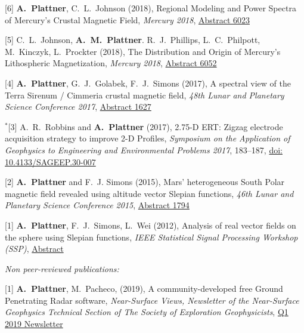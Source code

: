 \documentclass[10pt]{article}
\begin{document}
\spcp
\hspace{-0.5cm}[6] \textbf{A.~Plattner}, C.~L.~Johnson (2018),
Regional Modeling and Power Spectra of Mercury's Crustal Magnetic Field,
\emph{Mercury 2018},
\href{https://www.hou.usra.edu/meetings/mercury2018/pdf/6023.pdf}{Abstract 6023}

\spcp
\hspace{-0.5cm}[5] C.~L.~Johnson,
\textbf{A.~M.~Plattner}. R.~J.~Phillips, L.~C.~Philpott, M.~Kinczyk,
L.~Prockter (2018), The Distribution and Origin of Mercury's Lithospheric Magnetization, \emph{Mercury 2018},
\href{https://www.hou.usra.edu/meetings/mercury2018/pdf/6052.pdf}{Abstract
  6052}

\spcp
\hspace{-0.5cm}[4] \textbf{A.~Plattner}, G.~J.~Golabek, F.~J.~Simons (2017),
A spectral view of the Terra Sirenum / Cimmeria crustal magnetic
field,
\emph{48th Lunar and Planetary Science Conference 2017},
\href{http://www.lpi.usra.edu/meetings/lpsc2017/pdf/1627.pdf}{Abstract 1627}

\spcp
\hspace{-0.67cm}$^*$[3] A.~R.~Robbins and \textbf{A.~Plattner}
(2017),
2.75-D ERT: Zigzag electrode acquisition strategy to improve 2-D
Profiles,
\emph{Symposium on the Application of Geophysics to Engineering and
  Environmental Problems 2017}, 183--187,
\href{http://library.seg.org/doi/pdf/10.4133/SAGEEP.30-007}{doi: 10.4133/SAGEEP.30-007}

\spcp
\hspace{-0.5cm}[2] \textbf{A.~Plattner} and F.~J. Simons (2015),
Mars' heterogeneous South Polar magnetic field revealed using altitude vector Slepian functions,
\emph{46th Lunar and Planetary Science Conference 2015},
\href{http://www.hou.usra.edu/meetings/lpsc2015/pdf/1794.pdf}{Abstract 1794}

\spcp
\hspace{-0.5cm}[1] \textbf{A.~Plattner}, F.~J.~Simons, L.~Wei (2012),
Analysis of real vector fields on the sphere using Slepian functions,
\emph{IEEE Statistical Signal Processing Workshop (SSP)},
\href{http://ieeexplore.ieee.org/stamp/stamp.jsp?tp=&arnumber=6319659}{Abstract}

\spc
\emph{Non peer-reviewed publications:}

\spcp
\hspace{-0.5cm}[1] \textbf{A.~Plattner}, M.~Pacheco, (2019), A
community-developed free Ground Penetrating Radar software,
\emph{Near-Surface Views, Newsletter of the Near-Surface Geophysics
  Technical Section of The Society of Exploration Geophysicists},
\href{https://seg.org/Portals/0/SEG/News%20and%20Resources/Near%20Surface/Near%20Surface%20Newsletter/2011-present/2019_Q1.pdf}{Q1
  2019 Newsletter}
\end{document}
